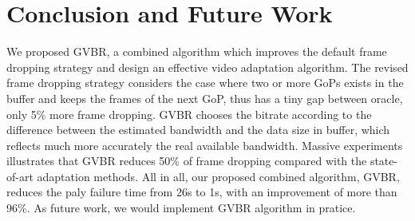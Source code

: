 \section{Conclusion and Future Work}
We proposed GVBR, a combined algorithm which improves the default frame dropping strategy and design an effective video adaptation algorithm. The revised frame dropping strategy considers the case where two or more GoPs exists in the buffer and keeps the frames of the next GoP, thus has a tiny gap between oracle, only 5\% more frame dropping. GVBR chooses the bitrate according to the difference between the estimated bandwidth and the data size in buffer, which reflects much more accurately the real available bandwidth. Massive experiments illustrates that GVBR reduces 50\% of frame dropping compared with the state-of-art adaptation methods. All in all, our proposed combined algorithm, GVBR, reduces the paly failure time from 26s to 1s, with an improvement of more than 96\%.
As future work, we would implement GVBR algorithm in pratice. 